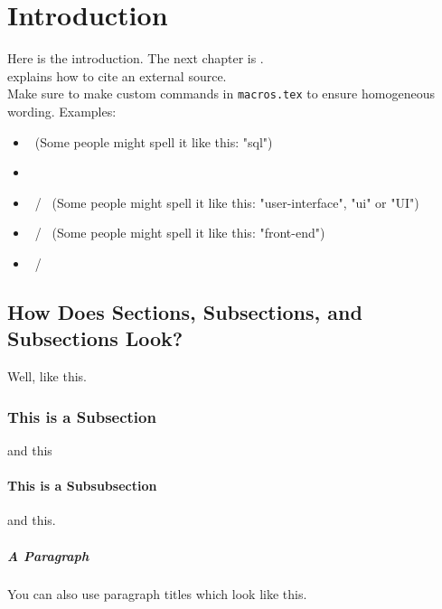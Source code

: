 \chapter{Introduction} \label{chap:introduction}
Here is the introduction. The next chapter is .\\ %
 explains how to cite an external source.\\

Make sure to make custom commands in \texttt{macros.tex} to ensure homogeneous wording. Examples:
\begin{itemize}
    \item \sql\ (Some people might spell it like this: "sql")
    \item \sqldb
    \item \Ui\ / \ui\ (Some people might spell it like this: "user-interface", "ui" or "UI")
    \item \Frontend\ / \frontend\ (Some people might spell it like this: "front-end")
    \item \Backend\ / \backend
\end{itemize}

\section{How Does Sections, Subsections, and Subsections Look?}
Well, like this.
\subsection{This is a Subsection}
and this
\subsubsection{This is a Subsubsection}
and this.

\paragraph{A Paragraph}
You can also use paragraph titles which look like this.

\lipsum